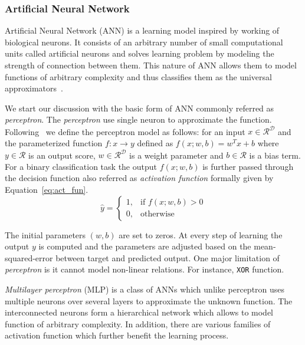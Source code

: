 \subsubsection{Artificial Neural Network}
\label{sub:ann}
Artificial Neural Network (ANN) is a learning model inspired by working of biological neurons. It consists of an arbitrary number of small computational units called artificial neurons and solves learning problem by modeling the strength of connection between them. This nature of ANN allows them to model functions of arbitrary complexity and thus classifies them as the universal approximators~\cite{hornik1989multilayer}.

We start our discussion with the basic form of ANN commonly referred as \emph{perceptron}. The \emph{perceptron} use single neuron to approximate the function. Following~\cite{mitchell1990machine} we define the perceptron model as follows: for an input $x\in\mathcal{R^D}$ and the parameterized function $f:x\rightarrow y$ defined as $f(x;w,b)=w^Tx+b$ where  $y\in\mathcal{R}$ is an output score, $w\in\mathcal{R^D}$ is a weight parameter and $b\in\mathcal{R}$ is a bias term. For a binary classification task the output $f(x;w,b)$ is further passed through the decision function also referred as
\emph{activation function} formally given by Equation~\ref{eq:act_fun}. 
\begin{equation}
\label{eq:act_fun}
  \hat{y}= 
\begin{cases}
    1,& \text{if } f(x;w,b)> 0\\
    0,              & \text{otherwise}
\end{cases}  
\end{equation}

The initial parameters $(w,b)$ are set to zeros. At every step of learning the output $y$ is computed and the parameters are adjusted based on the mean-squared-error between target and predicted output. One major limitation of \emph{perceptron} is it cannot model non-linear relations. For instance, \texttt{XOR} function. 

\emph{Multilayer perceptron} (MLP) is a class of ANNs which unlike perceptron uses multiple neurons over several layers to approximate the unknown function. The interconnected neurons form a hierarchical network which allows to model function of arbitrary complexity. In addition, there are various families of activation function which further benefit the learning process.

